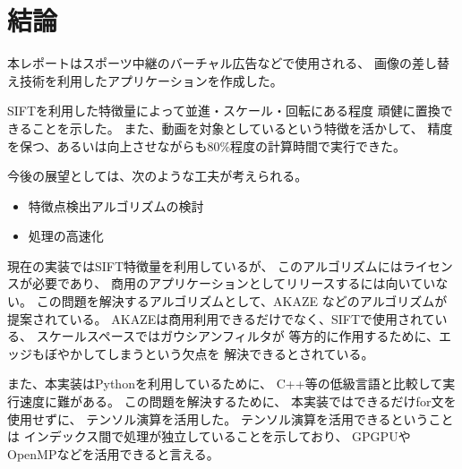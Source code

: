 \section{結論}\label{sec:conc}
本レポートはスポーツ中継のバーチャル広告などで使用される、
画像の差し替え技術を利用したアプリケーションを作成した。

SIFTを利用した特徴量によって並進・スケール・回転にある程度
頑健に置換できることを示した。
また、動画を対象としているという特徴を活かして、
精度を保つ、あるいは向上させながらも80\%程度の計算時間で実行できた。


今後の展望としては、次のような工夫が考えられる。
\begin{itemize}
    \item 特徴点検出アルゴリズムの検討
    \item 処理の高速化
\end{itemize}

現在の実装ではSIFT特徴量を利用しているが、
このアルゴリズムにはライセンスが必要であり、
商用のアプリケーションとしてリリースするには向いていない。
この問題を解決するアルゴリズムとして、AKAZE\cite{akaze}
などのアルゴリズムが提案されている。
AKAZEは商用利用できるだけでなく、SIFTで使用されている、
スケールスペースではガウシアンフィルタが
等方的に作用するために、エッジもぼやかしてしまうという欠点を
解決できるとされている\cite{akaze}。

また、本実装はPythonを利用しているために、
C++等の低級言語と比較して実行速度に難がある。
この問題を解決するために、
本実装ではできるだけfor文を使用せずに、
テンソル演算を活用した。
テンソル演算を活用できるということは
インデックス間で処理が独立していることを示しており、
GPGPUやOpenMPなどを活用できると言える。

